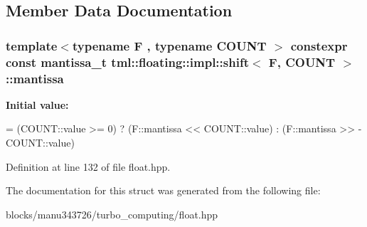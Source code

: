 \subsection{Member Data Documentation}
\hypertarget{structtml_1_1floating_1_1impl_1_1shift_ac0cf4c59b28cb1a4c69cbb1d38c589d8}{
\subsubsection[{mantissa}]{\setlength{\rightskip}{0pt plus 5cm}template$<$typename F , typename C\+O\+U\+N\+T $>$ constexpr const mantissa\+\_\+t {\bf tml\+::floating\+::impl\+::shift}$<$ F, C\+O\+U\+N\+T $>$\+::mantissa\hspace{0.3cm}{\ttfamily [static]}}}\label{structtml_1_1floating_1_1impl_1_1shift_ac0cf4c59b28cb1a4c69cbb1d38c589d8}
{\bfseries Initial value\+:}
\begin{DoxyCode}
= (COUNT::value >= 0) ? (F::mantissa << COUNT::value) :
                                                                                   (F::mantissa >> -
      COUNT::value)
\end{DoxyCode}


Definition at line 132 of file float.\+hpp.



The documentation for this struct was generated from the following file\+:\begin{DoxyCompactItemize}
\item 
blocks/manu343726/turbo\+\_\+computing/float.\+hpp\end{DoxyCompactItemize}
